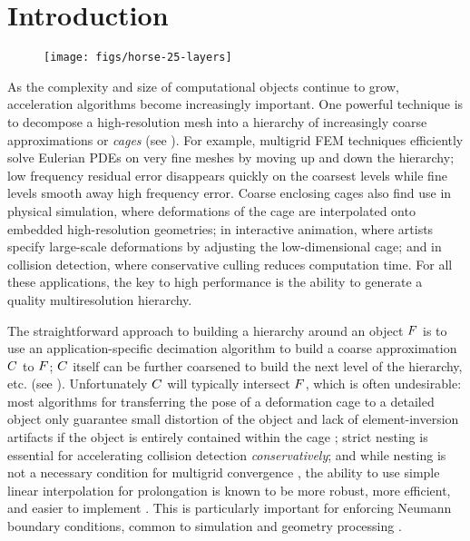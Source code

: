 \section{Introduction}
\vspace*{-0.3cm}
\label{sec:introduction}

\begin{figure}[b]
  \texttt{[image: figs/horse-25-layers]}
  \caption{}
  \label{fig:horse-25-layers}
\end{figure}

As the complexity and size of computational objects continue to grow,
acceleration algorithms become increasingly important. One powerful technique
is to decompose a high-resolution mesh into a hierarchy of increasingly coarse
approximations or \emph{cages} (see ). For example,
multigrid FEM techniques efficiently solve Eulerian PDEs on very fine
meshes by moving up and down the hierarchy; low frequency residual error
disappears quickly on the coarsest levels while fine levels smooth away high
frequency error. Coarse enclosing cages also find use in physical simulation,
where deformations of the cage are interpolated onto embedded high-resolution
geometries; in interactive animation, where artists specify large-scale
deformations by adjusting the low-dimensional cage; and in collision detection,
where conservative culling reduces computation time. For all these
applications, the key to high performance is the ability to generate a quality
multiresolution hierarchy.

The straightforward approach to building a hierarchy around an object $F$
is to use an application-specific decimation algorithm to build a coarse
approximation $C$ to $F$; $C$ itself can be further coarsened to
build the next level of the hierarchy, etc. (see ).
Unfortunately $C$ will typically intersect $F$, which is often
undesirable: most algorithms for transferring the pose of a deformation cage to
a detailed object only guarantee small distortion of the object and lack of
element-inversion artifacts if the object is entirely contained within the cage
\cite{HarmonicCoodinates07,Ben-Chen:2009:VHM}; strict nesting is essential for
accelerating collision detection \emph{conservatively}; and while nesting is
not a necessary condition for multigrid convergence
\cite{Chan96overlappingschwarz}, the ability to use simple linear interpolation
for prolongation is known to be more robust, more efficient, and easier to
implement \cite{chan2000robust,dickopf2010multilevel}. This is
particularly important for enforcing Neumann boundary conditions, common to
simulation and geometry processing \cite{chan1999boundary}.


